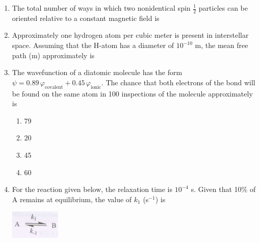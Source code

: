 \documentclass[12pt]{article}
\begin{document}
\begin{enumerate}
\item The total number of ways in which two nonidentical spin $\frac{1}{2}$ particles can be oriented relative to a constant magnetic field is
\begin{enumerate}
\end{enumerate}


\item Approximately one hydrogen atom per cubic meter is present in interstellar space. Assuming that the H-atom has a diameter of $10^{-10}$ m, the mean free path (m) approximately is
\begin{enumerate}
    \hfill{}
\end{enumerate}

\item The wavefunction of a diatomic molecule has the form $\psi = 0.89\, \varphi_{\text{covalent}} + 0.45\, \varphi_{\text{ionic}}$. The chance that both electrons of the bond will be found on the same atom in 100 inspections of the molecule approximately is

\begin{enumerate}
\item 79
\item 20
\item 45
\item 60
\end{enumerate}    \hfill{}




\item For the reaction given below, the relaxation time is $10^{-4}$ s. Given that 10\% of A remains at equilibrium, the value of $k_1$ (s$^{-1}$) is

\begin{center}
\includegraphics[width=0.3\columnwidth]{figs/q58.png}
\end{center}


\end{enumerate}
\end{document}

